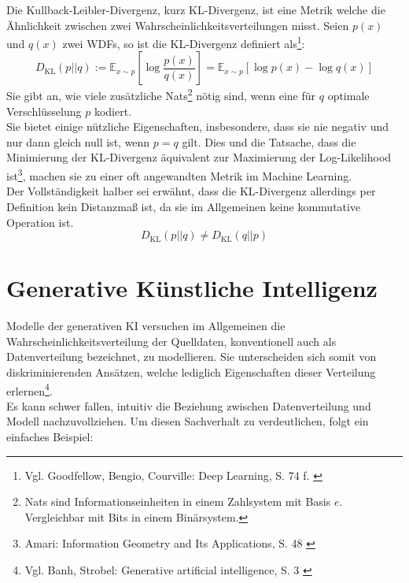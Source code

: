 Die Kullback-Leibler-Divergenz, kurz KL-Divergenz, ist eine Metrik welche die Ähnlichkeit zwischen zwei Wahrscheinlichkeitsverteilungen misst. Seien $p(x)$ und $q(x)$ zwei \ac{WDF}s, so ist die KL-Divergenz definiert als\footnote{
    Vgl. Goodfellow, Bengio, Courville: Deep Learning, S. 74 f.
    \cite{Goodfellow-et-al-2016}
}:
\begin{equation}
    D_\text{KL}(p||q) 
    := \mathbb{E}_{x \sim p} \left [
    \log \frac{p(x)} {q(x)}
    \right ]
    = \mathbb{E}_{x \sim p} \left [ 
        \log p(x) - \log q(x)
        \right ]
\end{equation}
Sie gibt an, wie viele zusätzliche Nats\footnote{
    Nats sind Informationseinheiten in einem Zahlsystem mit Basis $e$. Vergleichbar mit Bits in einem Binärsystem. 
} nötig sind, wenn eine für $q$ optimale Verschlüsselung $p$ kodiert. \\
Sie bietet einige nützliche Eigenschaften, insbesondere, dass sie nie negativ und nur dann gleich null ist, wenn $p = q$ gilt. Dies und die Tatsache, dass die Minimierung der KL-Divergenz äquivalent zur Maximierung der Log-Likelihood ist\footnote{
    Amari: Information Geometry and Its Applications, S. 48
    \cite{10.5555/3019383}
}, machen sie zu einer oft angewandten Metrik im Machine Learning. \\
Der Vollständigkeit halber sei erwähnt, dass die KL-Divergenz allerdings per Definition kein Distanzmaß ist, da sie im Allgemeinen keine kommutative Operation ist.  
\begin{equation}
    D_\text{KL}(p||q) \ne D_\text{KL}(q||p) 
\end{equation}



\section{Generative Künstliche Intelligenz}

Modelle der generativen \ac{KI} versuchen im Allgemeinen die Wahrscheinlichkeitsverteilung der Quelldaten, konventionell auch als Datenverteilung bezeichnet, zu modellieren. Sie unterscheiden sich somit von diskriminierenden Ansätzen, welche lediglich Eigenschaften dieser Verteilung erlernen\footnote{
    Vgl. Banh, Strobel: Generative artificial intelligence, S. 3
    \cite{banh2023generative}
}.\\
Es kann schwer fallen, intuitiv die Beziehung zwischen Datenverteilung und Modell nachzuvollziehen. Um diesen Sachverhalt zu verdeutlichen, folgt ein einfaches Beispiel:

